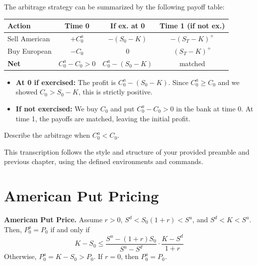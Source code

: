 \begin{remark}
    The arbitrage strategy can be summarized by the following payoff table:
    
    \begin{center}
    \begin{tabular}{|l|c|c|c|}
    \hline
    \textbf{Action} & \textbf{Time 0} & \textbf{If ex. at 0} & \textbf{Time 1 (if not ex.)} \\ \hline
    Sell American & $+C_0^a$ & $-(S_0 - K)$ & $-(S_T - K)^+$ \\ \hline
    Buy European & $-C_0$ & $0$ & $(S_T - K)^+$ \\ \hline
    \textbf{Net} & $C_0^a - C_0 > 0$ & $C_0^a - (S_0 - K)$ & matched \\ \hline
    \end{tabular}
    \end{center}

    \begin{itemize}
        \item \textbf{At 0 if exercised:} The profit is $C_0^a - (S_0 - K)$. Since $C_0^a \geq C_0$ and we showed $C_0 > S_0 - K$, this is strictly positive.
        \item \textbf{If not exercised:} We buy $C_0$ and put $C_0^a - C_0 > 0$ in the bank at time 0. At time 1, the payoffs are matched, leaving the initial profit.
    \end{itemize}
\end{remark}

\begin{homework}
    Describe the arbitrage when $C_0^a < C_0$.
\end{homework}

This transcription follows the style and structure of your provided preamble and previous chapter, using the defined environments and commands.

\section{American Put Pricing}

\begin{proposition}
    \textbf{American Put Price.} Assume $r > 0$, $S^d < S_0(1+r) < S^u$, and $S^d < K < S^u$. Then, $P_0^a = P_0$ if and only if
    \begin{equation}
        K - S_0 \leq \frac{S^u - (1+r)S_0}{S^u - S^d} \cdot \frac{K - S^d}{1+r} \tag{$*$}
    \end{equation}
    Otherwise, $P_0^a = K - S_0 > P_0$. If $r = 0$, then $P_0^a = P_0$.
\end{proposition}

